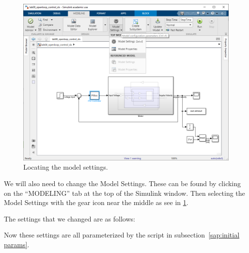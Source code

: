 \documentclass[12pt]{article}
\newcommand\matlab{matlab}
\begin{document}
\begin{figure}
    \centering
    \includegraphics[width=\linewidth]{img/task00_020_finding_model_settings.png}
    \caption{Locating the model settings.}
    \label{fig:task00_020_finding_model_settings}
\end{figure}





We will also need to change the Model Settings. These can be found by clicking on the ``MODELING'' tab at the top of the Simulink window. Then selecting the Model Settings with the gear icon near the middle as see in \ref{fig:task00_020_finding_model_settings}.

The settings that we changed are as follows:

Now these settings are all parameterized by the script in  subsection~\ref{sap:initial params}.
\end{document}
